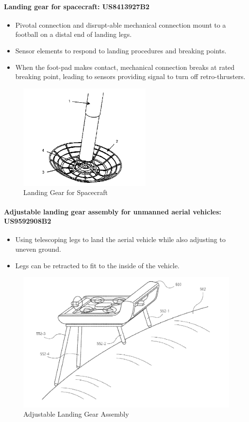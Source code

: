 \paragraph{Landing gear for spacecraft: US8413927B2}
\begin{itemize}
    \item Pivotal connection and disrupt-able mechanical connection mount to a football on a distal end of landing legs.
    \item Sensor elements to respond to landing procedures and breaking points.
    \item When the foot-pad makes contact, mechanical connection breaks at rated breaking point, leading to sensors providing signal to turn off retro-thrusters.
\end{itemize}

\begin{figure}[H]
    \centering
    \includegraphics{src/figs/Patent5.png}
    \caption{Landing Gear for Spacecraft}
    \label{fig:P5}
\end{figure}

\paragraph{Adjustable landing gear assembly for unmanned aerial vehicles: US9592908B2}
\begin{itemize}
    \item Using telescoping legs to land the aerial vehicle while also adjusting to uneven ground.
    \item Legs can be retracted to fit to the inside of the vehicle.
\end{itemize}


\begin{figure}[H]
    \centering
    \includegraphics{src/figs/Patent6.png}
    \caption{Adjustable Landing Gear Assembly}
    \label{fig:P6}
\end{figure}

